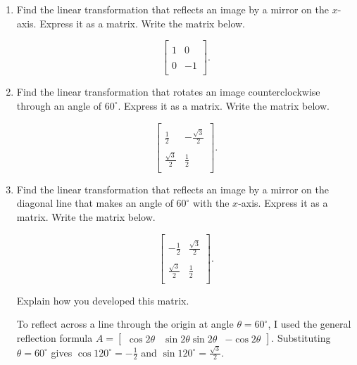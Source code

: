 \documentclass{ximera}
\begin{document}
\begin{enumerate}
    \item Find the linear transformation that reflects an image by a mirror on the $x$-axis.  Express it as a matrix.  Write the matrix below.

$$\left[{\begin{array}{cc}
\\
1 & 0\\
\\
0 & -1 \\
\end{array}}\right].$$

\item Find the linear transformation that rotates an image counterclockwise through an angle of $60^{\circ}$.  Express it as a matrix.  Write the matrix below.

$$\left[{\begin{array}{cc}
\\
\frac{1}{2} & -\frac{\sqrt{3}}{2} \\
\\
\frac{\sqrt{3}}{2} & \frac{1}{2} \\
\end{array}}\right].$$


\item Find the linear transformation that reflects an image by a mirror on the diagonal line that makes an angle of $60^{\circ}$ with the $x$-axis.  Express it as a matrix.  Write the matrix below.

$$\left[{\begin{array}{cc}
\\
-\frac{1}{2} & \frac{\sqrt{3}}{2}\\
\\
\frac{\sqrt{3}}{2} & \frac{1}{2} \\
\end{array}}\right].$$

\vspace{8pt}


\noindent Explain how you developed this matrix.
\vspace{5pt}

\noindent To reflect across a line through the origin at angle $\theta = 60^\circ$, I used the general reflection formula $A = \begin{bmatrix} \cos 2\theta & \sin 2\theta \sin 2\theta & -\cos 2\theta \end{bmatrix}$. Substituting $\theta = 60^\circ$ gives $\cos 120^\circ = -\frac{1}{2}$ and $\sin 120^\circ = \frac{\sqrt{3}}{2}$.
\end{enumerate}
\end{document}
